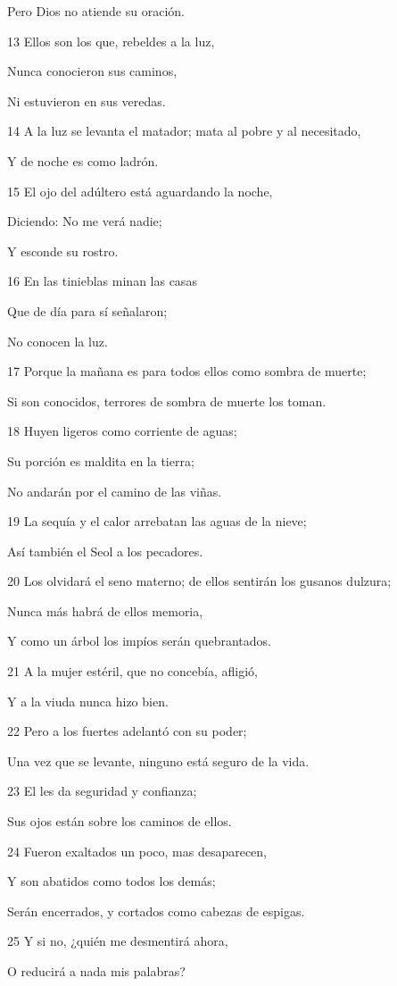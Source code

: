 \par Pero Dios no atiende su oración.
\par 13 Ellos son los que, rebeldes a la luz,
\par Nunca conocieron sus caminos,
\par Ni estuvieron en sus veredas.
\par 14 A la luz se levanta el matador; mata al pobre y al necesitado, 
\par Y de noche es como ladrón.
\par 15 El ojo del adúltero está aguardando la noche,
\par Diciendo: No me verá nadie;
\par Y esconde su rostro.
\par 16 En las tinieblas minan las casas
\par Que de día para sí señalaron;
\par No conocen la luz.
\par 17 Porque la mañana es para todos ellos como sombra de muerte;
\par Si son conocidos, terrores de sombra de muerte los toman.
\par 18 Huyen ligeros como corriente de aguas;
\par Su porción es maldita en la tierra;
\par No andarán por el camino de las viñas.
\par 19 La sequía y el calor arrebatan las aguas de la nieve; 
\par Así también el Seol a los pecadores.
\par 20 Los olvidará el seno materno; de ellos sentirán los gusanos dulzura;
\par Nunca más habrá de ellos memoria,
\par Y como un árbol los impíos serán quebrantados.
\par 21 A la mujer estéril, que no concebía, afligió,
\par Y a la viuda nunca hizo bien.
\par 22 Pero a los fuertes adelantó con su poder;
\par Una vez que se levante, ninguno está seguro de la vida.
\par 23 El les da seguridad y confianza;
\par Sus ojos están sobre los caminos de ellos.
\par 24 Fueron exaltados un poco, mas desaparecen,
\par Y son abatidos como todos los demás;
\par Serán encerrados, y cortados como cabezas de espigas.
\par 25 Y si no, ¿quién me desmentirá ahora,
\par O reducirá a nada mis palabras?

